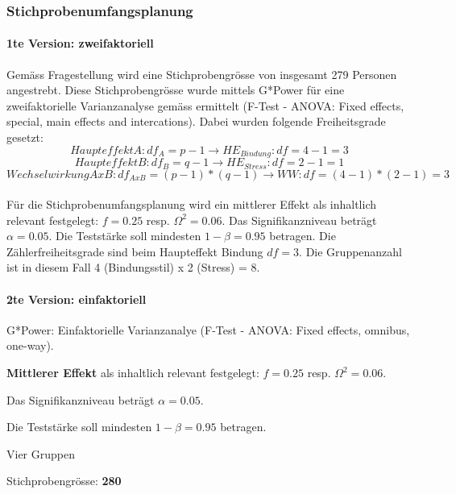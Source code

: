 \subsubsection{Stichprobenumfangsplanung}
\paragraph{1te Version: zweifaktoriell}
Gemäss Fragestellung wird eine Stichprobengrösse von insgesamt 279 Personen angestrebt. Diese Stichprobengrösse wurde mittels G*Power \cite{Faul2009} für eine zweifaktorielle Varianzanalyse gemäss  ermittelt (F-Test - ANOVA: Fixed effects, special, main effects and intercations). Dabei wurden folgende Freiheitsgrade gesetzt:
\begin{equation}
    Haupteffekt A: df_{A} = p-1 \rightarrow HE_{Bindung}: df = 4-1=3
\end{equation}
\begin{equation}
    Haupteffekt B: df_{B} = q-1 \rightarrow HE_{Stress}: df = 2-1=1
\end{equation}
\begin{equation}
    Wechselwirkung AxB: df_{AxB} = (p-1)*(q-1) \rightarrow WW: df = (4-1)*(2-1)=3
\end{equation}\\

Für die Stichprobenumfangsplanung wird ein mittlerer Effekt als inhaltlich relevant festgelegt: $f = 0.25$ resp. $\Omega^2 = 0.06$. Das Signifikanzniveau beträgt $\alpha=0.05$. Die Teststärke soll mindesten $1-\beta=0.95$ betragen. Die Zählerfreiheitsgrade sind beim Haupteffekt Bindung $df = 3$. Die Gruppenanzahl ist in diesem Fall 4 (Bindungsstil) x 2 (Stress) = 8.

\paragraph{2te Version: einfaktoriell}
\begin{APAitemize} 
    \item G*Power: Einfaktorielle Varianzanalye (F-Test - ANOVA: Fixed effects, omnibus, one-way).
    \item \textbf{Mittlerer Effekt} als inhaltlich relevant festgelegt: $f = 0.25$ resp. $\Omega^2 = 0.06$.
    \item Das Signifikanzniveau beträgt $\alpha=0.05$. 
    \item Die Teststärke soll mindesten $1-\beta=0.95$ betragen.
    \item Vier Gruppen
    \item Stichprobengrösse: \textbf{280}
\end{APAitemize}

